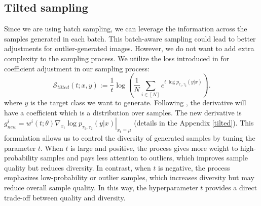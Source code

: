 \documentclass{article}
\begin{document}







\subsection{Tilted sampling}


Since we are using batch sampling, we can leverage the information across the samples generated in each batch. This batch-aware sampling could lead to better adjustments for outlier-generated images. However, we do not want to add extra complexity to the sampling process. We utilize the loss introduced in \cite{li2023tiltedlossesmachinelearning} for coefficient adjustment in our sampling process:
\begin{equation}
\mathcal{S}_{tilted}(t; x,y) := \frac{1}{t} \log \left( \frac{1}{N} \sum_{i \in [N]} e^{t \: \log p_{\tau_1,\tau_2}(y|x)} \right).
\end{equation}
where $y$ is the target class we want to generate. 
Following \cite{li2023tiltedlossesmachinelearning}, the derivative will have a coefficient which is a distribution over samples.
The new derivative  is $g^i_{new} =w^i(t; \theta)  \left. \nabla_{x_t} \log p_{\tau_1,\tau_2}(y|x)\right|_{x_t=\mu}$ (details in the Appendix \ref{tilted}). This formulation allows us to control the diversity of generated samples by tuning the parameter $t$. When $t$ is large and positive, the process gives more weight to high-probability samples and pays less attention to outliers, which improves sample quality but reduces diversity. In contrast, when $t$ is negative, the process emphasizes low-probability or outlier samples, which increases diversity but may reduce overall sample quality. In this way, the hyperparameter $t$ provides a direct trade-off between quality and diversity.
\end{document}
